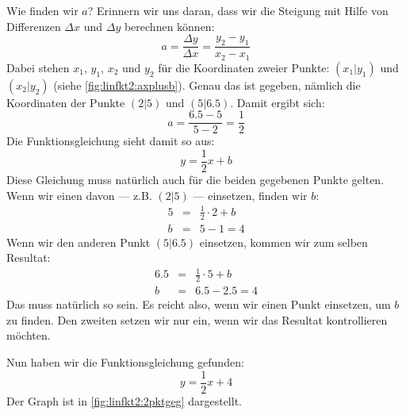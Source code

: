 \documentclass[%
11pt,%
twoside,%
titlepage,%
german,%
headsepline%
]{scrartcl}
\begin{document}
{Wie finden wir $a$? Erinnern wir uns daran, dass wir die Steigung mit Hilfe von Differenzen $\Delta x$ und $\Delta y$ berechnen k\"onnen:
\begin{displaymath}
  a=\frac{\Delta y}{\Delta x} = \frac{y_2 - y_1}{x_2 - x_1}
\end{displaymath}
Dabei stehen $x_1$, $y_1$, $x_2$ und $y_2$ f\"ur die Koordinaten zweier Punkte: $(x_1|y_1)$ und $(x_2|y_2)$ (siehe \ref{fig:linfkt2:axplusb}). Genau das ist gegeben, n\"amlich die Koordinaten der Punkte $(2|5)$ und $(5|6.5)$. Damit ergibt sich:
\begin{displaymath}
  a = \frac{6.5 - 5}{5-2} = \frac{1}{2}
\end{displaymath}
Die Funktionsgleichung sieht damit so aus:
\begin{displaymath}
  y = \frac{1}{2}x + b
\end{displaymath}
Diese Gleichung muss nat\"urlich auch f\"ur die beiden gegebenen Punkte gelten. Wenn wir einen davon --- z.B. $(2|5)$ --- einsetzen, finden wir $b$:
\begin{eqnarray*}
  5 & = & \frac{1}{2} \cdot 2 + b \\
  b & = & 5 - 1 = 4
\end{eqnarray*}
Wenn wir den anderen Punkt $(5|6.5)$ einsetzen, kommen wir zum selben Resultat:
\begin{eqnarray*}
  6.5 & = & \frac{1}{2} \cdot 5 + b \\
  b & = & 6.5 - 2.5 = 4
\end{eqnarray*}
Das muss nat\"urlich so sein. Es reicht also, wenn wir einen Punkt einsetzen, um $b$ zu finden. Den zweiten setzen wir nur ein, wenn wir das Resultat kontrollieren m\"ochten.

Nun haben wir die Funktionsgleichung gefunden:
\begin{displaymath}
  y=\frac{1}{2}x + 4
\end{displaymath}
Der Graph ist in \ref{fig:linfkt2:2pktgeg} dargestellt.

}
\end{document}
